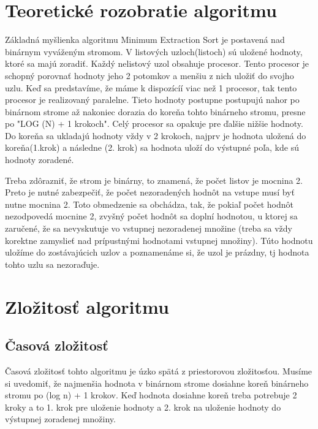 \documentclass[12pt,a4paper,titlepage,final]{article}
\begin{document}

\def\projname{Projekt z predmetu PRL \\ Implementácie algoritmu Minimum extraction sort}



\section{Teoretické rozobratie algoritmu}
Základná myšlienka algoritmu Minimum Extraction Sort je postavená nad binárnym vyváženým stromom. V listových uzloch(listoch) sú uložené hodnoty, ktoré sa majú zoradiť. Každý nelistový uzol obsahuje procesor. Tento procesor je schopný porovnať hodnoty jeho 2 potomkov a menšiu z nich uložiť do svojho uzlu. Keď sa predstavíme, že máme k dispozícíí viac než 1 procesor, tak tento procesor je realizovaný paralelne. Tieto hodnoty postupne postupujú nahor po binárnom strome až nakoniec dorazia do koreňa tohto binárneho stromu, presne po "LOG (N) + 1 krokoch". Celý procesor sa opakuje pre ďalšie nižšie hodnoty. Do koreňa sa ukladajú hodnoty vždy v 2 krokoch, najprv je hodnota uložená do koreňa(1.krok) a následne (2. krok) sa hodnota uloží do výstupné poľa, kde sú hodnoty zoradené.

Treba zdôrazniť, že strom je binárny, to znamená, že počet listov je mocnina 2. Preto je nutné zabezpečiť, že počet nezoradených hodnôt na vstupe musí byť nutne mocnina 2. Toto obmedzenie sa obchádza, tak, že pokiaľ počet hodnôt nezodpovedá mocnine 2, zvyšný počet hodnôt sa doplní hodnotou, u ktorej sa zaručené, že sa nevyskutuje vo vstupnej nezoradenej množine (treba sa vždy korektne zamyslieť nad prípustnými hodnotami vstupnej množiny). Túto hodnotu uložíme do zostávajúcich uzlov a poznamenáme si, že uzol je prázdny, tj hodnota tohto uzlu sa nezoraďuje.


\section{Zložitosť algoritmu}
\subsection{Časová zložitosť}
Časová zložitosť tohto algoritmu je úzko spätá z priestorovou zložitosťou. Musíme si uvedomiť, že najmenšia hodnota v binárnom strome dosiahne koreň binárneho stromu po (log n) + 1 krokov. Keď hodnota dosiahne koreň treba potrebuje 2 kroky a to 1. krok pre uloženie hodnoty a 2. krok na uloženie hodnoty do výstupnej zoradenej množiny.
\end{document}
